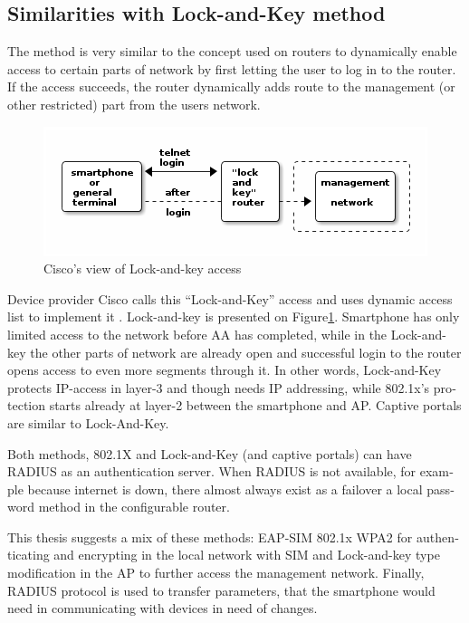 \documentclass[12pt,a4paper,english]{tutthesis}
\begin{document}
\begin{otherlanguage}{english}
\section{Similarities with Lock-and-Key method}
\label{sec-4-4}
The method is very similar to the concept used on routers to dynamically enable
access to certain parts of network by first letting the user to log in
to the router. If the access succeeds, the router dynamically adds
route to the management (or other restricted) part from the 
users network.




\begin{figure}[htb]
\centering
\includegraphics[width=.9\linewidth]{lockandkey.png}
\caption{\label{fig:lock-and-view}Cisco's view of Lock-and-key access}
\end{figure}




Device provider Cisco calls this  ``Lock-and-Key''
access and uses dynamic access list to implement it \cite[p.117]{lockandkeybook}.
Lock-and-key is presented on Figure\ref{fig:lock-and-view}.
 Smartphone has only limited access to the network before AA
has completed, while in the Lock-and-key
the other parts of network are already open and successful login to the router opens
access to even more segments through it. In other words, Lock-and-Key
protects IP-access in layer-3 and though needs IP addressing, while
802.1x's protection starts already at layer-2 between the smartphone
and AP. Captive portals are similar to Lock-And-Key.


Both methods, 802.1X and Lock-and-Key (and captive portals) can have RADIUS as an authentication server. 
When RADIUS is not available, for example because internet is down,
there almost always exist as a failover a local password method in the configurable 
router.








This thesis suggests a mix of these methods: EAP-SIM 802.1x WPA2 for
authenticating and encrypting in the local network with SIM and
Lock-and-key type modification in the AP to further access the 
management network. Finally, RADIUS protocol is used to transfer 
parameters, that the smartphone would need in communicating with 
devices in need of changes.


\end{otherlanguage}
\end{document}
